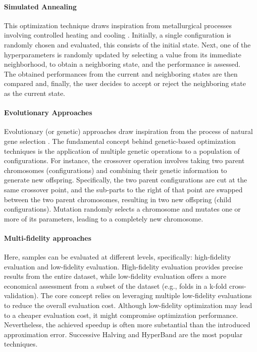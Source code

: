 \paragraph{Simulated Annealing}
This optimization technique draws inspiration from metallurgical processes involving controlled heating and cooling \cite{61}.
Initially, a single configuration is randomly chosen and evaluated, this consists of the initial state.
Next, one of the hyperparameters is randomly updated by selecting a value from its immediate neighborhood, to obtain a neighboring state, and the performance is assessed.
The obtained performances from the current and neighboring states are then compared and, finally, the user decides to accept or reject the neighboring state as the current state.

\paragraph{Evolutionary Approaches}
Evolutionary (or genetic) approaches draw inspiration from the process of natural gene selection \cite{49}.
The fundamental concept behind genetic-based optimization techniques is the application of multiple genetic operations to a population of configurations.
For instance, the crossover operation involves taking two parent chromosomes (configurations) and combining their genetic information to generate new offspring.
Specifically, the two parent configurations are cut at the same crossover point, and the sub-parts to the right of that point are swapped between the two parent chromosomes, resulting in two new offspring (child configurations).
Mutation randomly selects a chromosome and mutates one or more of its parameters, leading to a completely new chromosome.

\paragraph{Multi-fidelity approaches}
Here, samples can be evaluated at different levels, specifically: high-fidelity evaluation and low-fidelity evaluation.
High-fidelity evaluation provides precise results from the entire dataset, while low-fidelity evaluation offers a more economical assessment from a subset of the dataset (e.g., folds in a k-fold cross-validation).
The core concept relies on leveraging multiple low-fidelity evaluations to reduce the overall evaluation cost.
Although low-fidelity optimization may lead to a cheaper evaluation cost, it might compromise optimization performance.
Nevertheless, the achieved speedup is often more substantial than the introduced approximation error.
Successive Halving \cite{} and HyperBand \cite{} are the most popular techniques.

